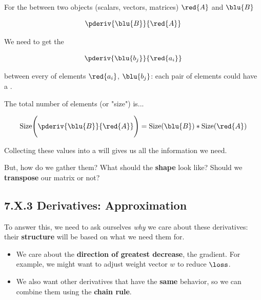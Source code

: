         \begin{concept}
            For the  between two objects (scalars, vectors, matrices) $\red{A}$ and $\blu{B}$
            
            \begin{equation*}
                \pderiv{\blu{B}}{\red{A}}
            \end{equation*}
            
            We need to get the 
            
            \begin{equation*}
                \pderiv{\blu{b_j}}{\red{a_i}}
            \end{equation*}
            
            between every  of elements $\red{a_i}$, $\blu{b_j}$: each pair of elements could have a .
            
            The total number of elements (or "size") is...
            
            \begin{equation*}
                \text{Size}\Bigg(  \pderiv{\blu{B}}{\red{A}}  \Bigg) 
                = 
                \text{Size}(\blu{B})
                *
                \text{Size}(\red{A})
            \end{equation*}
            
            Collecting these values into a  will gives us all the information we need.
        \end{concept}
        
        But, how do we gather them? What should the \textbf{shape} look like? Should we \textbf{transpose} our matrix or not?
    
    \secdiv
    
    \subsection*{7.X.3 \quad Derivatives: Approximation}
        
        To answer this, we need to ask ourselves \textit{why} we care about these derivatives: their \textbf{structure} will be based on what we need them for.
        
        \begin{itemize}
            \item We care about the \textbf{direction of greatest decrease}, the gradient. For example, we might want to adjust weight vector $w$ to reduce $\loss$.
            
            \item We also want other derivatives that have the \textbf{same} behavior, so we can combine them using the \textbf{chain rule}.
        \end{itemize}
        

